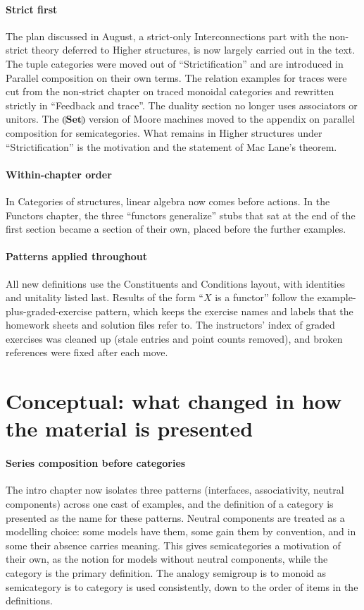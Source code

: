 \documentclass[11pt,a4paper]{article}
\newcommand{\tL}[1]{\llparenthesis\mathbf{#1}\rrparenthesis}   %
\begin{document}
\paragraph{Strict first} The plan discussed in August, a strict-only Interconnections part with
the non-strict theory deferred to Higher structures, is now largely carried out in the text. The
tuple categories were moved out of ``Strictification'' and are introduced in Parallel composition
on their own terms. The relation examples for traces were cut from the non-strict chapter on
traced monoidal categories and rewritten strictly in ``Feedback and trace''. The duality section
no longer uses associators or unitors. The $\tL{Set}$ version of Moore machines moved to the
appendix on parallel composition for semicategories. What remains in Higher structures under
``Strictification'' is the motivation and the statement of Mac Lane's theorem.

\paragraph{Within-chapter order} In Categories of structures, linear algebra now comes before
actions. In the Functors chapter, the three ``functors generalize'' stubs that sat at the end of
the first section became a section of their own, placed before the further examples.

\paragraph{Patterns applied throughout} All new definitions use the Constituents and Conditions
layout, with identities and unitality listed last. Results of the form ``$X$ is a functor'' follow
the example-plus-graded-exercise pattern, which keeps the exercise names and labels that the
homework sheets and solution files refer to. The instructors' index of graded exercises was
cleaned up (stale entries and point counts removed), and broken references were fixed after each
move.

\section{Conceptual: what changed in how the material is presented}

\paragraph{Series composition before categories} The intro chapter now isolates three patterns
(interfaces, associativity, neutral components) across one cast of examples, and the definition
of a category is presented as the name for these patterns. Neutral components are treated as a
modelling choice: some models have them, some gain them by convention, and in some their absence
carries meaning. This gives semicategories a motivation of their own, as the notion for models
without neutral components, while the category is the primary definition. The analogy
semigroup is to monoid as semicategory is to category is used consistently, down to the order of
items in the definitions.
\end{document}

